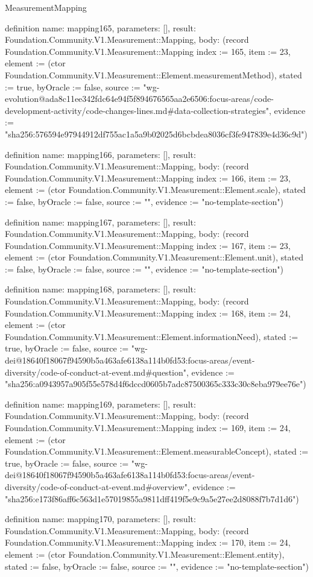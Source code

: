 \begin{lexlean}{MeasurementMapping}
\begin{semanticmodule}
definition{
  name: mapping165,
  parameters: [],
  result: Foundation.Community.V1.Measurement::Mapping,
  body: (record Foundation.Community.V1.Measurement::Mapping {index := 165, item := 23, element := (ctor Foundation.Community.V1.Measurement::Element.measurementMethod), stated := true, byOracle := false, source := "wg-evolution@ada8c11ee342fdc64e94f5f894676565aa2e6506:focus-areas/code-development-activity/code-changes-lines.md#data-collection-strategies", evidence := "sha256:576594e97944912df755ac1a5a9b02025d6bcbdea8036cf3fe947839e4d36c9d"})
}

definition{
  name: mapping166,
  parameters: [],
  result: Foundation.Community.V1.Measurement::Mapping,
  body: (record Foundation.Community.V1.Measurement::Mapping {index := 166, item := 23, element := (ctor Foundation.Community.V1.Measurement::Element.scale), stated := false, byOracle := false, source := "", evidence := "no-template-section"})
}

definition{
  name: mapping167,
  parameters: [],
  result: Foundation.Community.V1.Measurement::Mapping,
  body: (record Foundation.Community.V1.Measurement::Mapping {index := 167, item := 23, element := (ctor Foundation.Community.V1.Measurement::Element.unit), stated := false, byOracle := false, source := "", evidence := "no-template-section"})
}

definition{
  name: mapping168,
  parameters: [],
  result: Foundation.Community.V1.Measurement::Mapping,
  body: (record Foundation.Community.V1.Measurement::Mapping {index := 168, item := 24, element := (ctor Foundation.Community.V1.Measurement::Element.informationNeed), stated := true, byOracle := false, source := "wg-dei@18640f18067f94590b5a463afe6138a114b0fd53:focus-areas/event-diversity/code-of-conduct-at-event.md#question", evidence := "sha256:a0943957a905f55e578d4f6dccd0605b7adc87500365c333c30c8eba979ee76e"})
}

definition{
  name: mapping169,
  parameters: [],
  result: Foundation.Community.V1.Measurement::Mapping,
  body: (record Foundation.Community.V1.Measurement::Mapping {index := 169, item := 24, element := (ctor Foundation.Community.V1.Measurement::Element.measurableConcept), stated := true, byOracle := false, source := "wg-dei@18640f18067f94590b5a463afe6138a114b0fd53:focus-areas/event-diversity/code-of-conduct-at-event.md#overview", evidence := "sha256:e173f86aff6c563d1e57019855a9811dff419f5e9c9a5e27ee2d8088f7b7d1d6"})
}

definition{
  name: mapping170,
  parameters: [],
  result: Foundation.Community.V1.Measurement::Mapping,
  body: (record Foundation.Community.V1.Measurement::Mapping {index := 170, item := 24, element := (ctor Foundation.Community.V1.Measurement::Element.entity), stated := false, byOracle := false, source := "", evidence := "no-template-section"})
}


\end{semanticmodule}
\end{lexlean}
